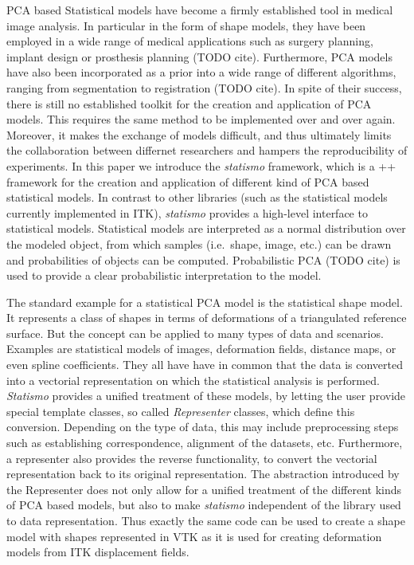 \documentclass{InsightArticle}
\newcommand{\statismo}{\emph{statismo}\xspace}
\newcommand{\Statismo}{\emph{Statismo}\xspace}
\begin{document}
PCA based Statistical models have become a firmly established tool in
medical image analysis. In particular in the form of shape models,
they have been employed in a wide range of medical applications such
as surgery planning, implant design or prosthesis planning (TODO
cite). Furthermore, PCA models have also been incorporated as a prior
into a wide range of different algorithms, ranging from segmentation
to registration (TODO cite).  In spite of their success, there is
still no established toolkit for the creation and
application of PCA models. This requires the same method to be
implemented over and over again. Moreover, it makes the exchange of
models difficult, and thus ultimately limits the collaboration between
differnet researchers and hampers the reproducibility of experiments.
In this paper we introduce the \statismo framework, which is a \C++
framework for the creation and application of different kind of PCA
based statistical models.  In contrast to other libraries (such as the statistical models currently
implemented in ITK), \statismo provides a high-level interface to statistical
models. Statistical models are interpreted as a normal distribution
over the modeled object, from which samples (i.e.\ shape, image, etc.)
can be drawn and probabilities of objects can be
computed. Probabilistic PCA (TODO cite) is used to provide a
clear probabilistic interpretation to the model. 


The standard example for a statistical PCA model is the statistical
shape model.  It represents a class of shapes in terms of deformations
of a triangulated reference surface. But the concept can be applied to
many types of data and scenarios. Examples are statistical models of
images, deformation fields, distance maps, or even spline
coefficients. They all have have in common that the data is converted
into a vectorial representation on which the statistical analysis is
performed.  \Statismo provides a unified treatment of these models, by
letting the user provide special template classes, so called
\emph{Representer} classes, which define this conversion.  Depending
on the type of data, this may include preprocessing steps such as establishing
correspondence, alignment of the datasets, etc.  Furthermore, a
representer also provides the reverse functionality, to convert the
vectorial representation back to its original representation.   
The abstraction introduced by the Representer does not only allow for a unified treatment 
of the different kinds of PCA based models, but also to make \statismo
independent of the library used to  data representation. Thus exactly the same code
can be used to create a shape model with shapes represented in VTK as
it is used for creating deformation models from ITK displacement fields.  
\end{document}
